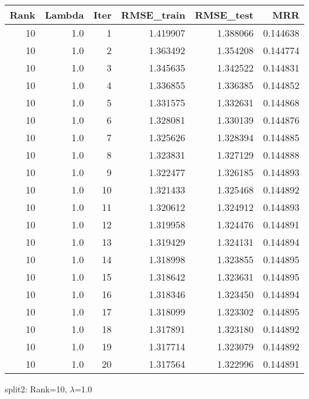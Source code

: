 \begin{tabular}{rrrrrr}
\toprule
 Rank &  Lambda &  Iter &  RMSE\_train &  RMSE\_test &       MRR \\
\midrule
   10 &     1.0 &     1 &    1.419907 &   1.388066 &  0.144638 \\
   10 &     1.0 &     2 &    1.363492 &   1.354208 &  0.144774 \\
   10 &     1.0 &     3 &    1.345635 &   1.342522 &  0.144831 \\
   10 &     1.0 &     4 &    1.336855 &   1.336385 &  0.144852 \\
   10 &     1.0 &     5 &    1.331575 &   1.332631 &  0.144868 \\
   10 &     1.0 &     6 &    1.328081 &   1.330139 &  0.144876 \\
   10 &     1.0 &     7 &    1.325626 &   1.328394 &  0.144885 \\
   10 &     1.0 &     8 &    1.323831 &   1.327129 &  0.144888 \\
   10 &     1.0 &     9 &    1.322477 &   1.326185 &  0.144893 \\
   10 &     1.0 &    10 &    1.321433 &   1.325468 &  0.144892 \\
   10 &     1.0 &    11 &    1.320612 &   1.324912 &  0.144893 \\
   10 &     1.0 &    12 &    1.319958 &   1.324476 &  0.144891 \\
   10 &     1.0 &    13 &    1.319429 &   1.324131 &  0.144894 \\
   10 &     1.0 &    14 &    1.318998 &   1.323855 &  0.144895 \\
   10 &     1.0 &    15 &    1.318642 &   1.323631 &  0.144895 \\
   10 &     1.0 &    16 &    1.318346 &   1.323450 &  0.144894 \\
   10 &     1.0 &    17 &    1.318099 &   1.323302 &  0.144895 \\
   10 &     1.0 &    18 &    1.317891 &   1.323180 &  0.144892 \\
   10 &     1.0 &    19 &    1.317714 &   1.323079 &  0.144892 \\
   10 &     1.0 &    20 &    1.317564 &   1.322996 &  0.144891 \\
\bottomrule
\end{tabular}

\caption{split2: Rank=10, $\lambda$=1.0}
